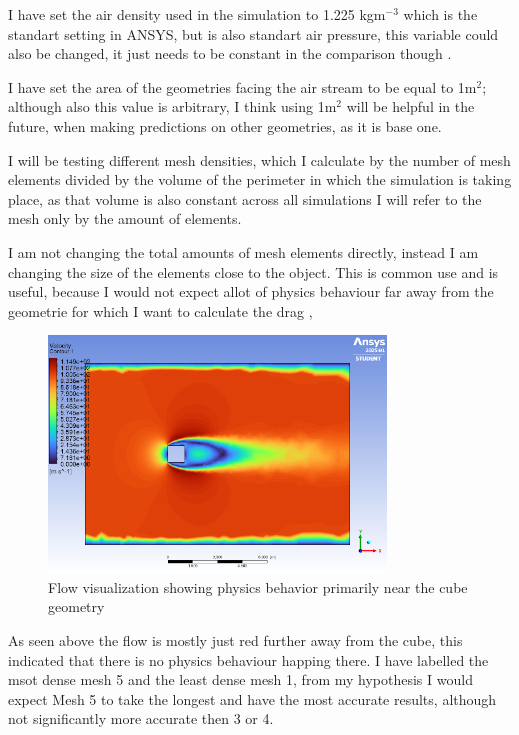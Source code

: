 \documentclass[12pt,a4paper]{article}
\begin{document}
I have set the air density used in the simulation to 1.225 kgm$^{-3}$ which is the standart setting in ANSYS, but is also standart air pressure, this variable could also be changed, it just needs to be constant in the comparison though \cite{ib_physics_data}.

 I have set the area of the geometries facing the air stream to be equal to 1m$^2$; although also this value is arbitrary, I think using 1m$^2$ will be helpful in the future, when making predictions on other geometries, as it is base one.

I will be testing different mesh densities, which I calculate by the number of mesh elements divided by the volume of the perimeter in which the simulation is taking place, as that volume is also constant across all simulations I will refer to the mesh only by the amount of elements.

I am not changing the total amounts of mesh elements directly, instead I am changing the size of the elements close to the object. This is common use and is useful, because I would not expect allot of physics behaviour far away from the geometrie for which I want to calculate the drag \cite{versteeg2007computational}, 

\begin{figure}[H]
    \centering
    \includegraphics[width=0.8\textwidth]{image1.png}
    \caption{Flow visualization showing physics behavior primarily near the cube geometry}
    \label{fig:flow_viz}
\end{figure}

As seen above the flow is mostly just red further away from the cube, this indicated that there is no physics behaviour happing there. I have labelled the msot dense mesh 5 and the least dense mesh 1, from my hypothesis I would expect Mesh 5 to take the longest and have the most accurate results, although not significantly more accurate then 3 or 4. 
\end{document}
